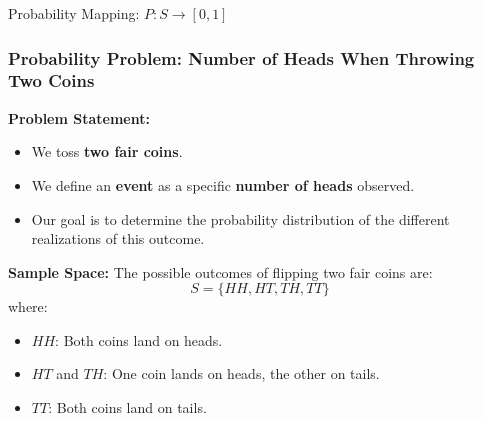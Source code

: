 \documentclass[handout]{beamer} %
\begin{document}
\begin{frame}{Probability Mapping: \(P: S \to [0,1]\)}
    \begin{center}
    \end{center}
\end{frame}


\begin{frame}
    \frametitle{Probability Problem: Number of Heads When Throwing Two Coins}

    \textbf{Problem Statement:}
    \begin{itemize}
        \item We toss \textbf{two fair coins}.
        \item We define an \textbf{event} as a specific \textbf{number of heads} observed.
        \item Our goal is to determine the probability distribution of the different realizations of this outcome.
    \end{itemize}

    \textbf{Sample Space:} The possible outcomes of flipping two fair coins are:
    \[
    S = \{ HH, HT, TH, TT \}
    \]
    where:
    \begin{itemize}
        \item \(HH\): Both coins land on heads.
        \item \(HT\) and \(TH\): One coin lands on heads, the other on tails.
        \item \(TT\): Both coins land on tails.
    \end{itemize}

\end{frame}
\end{document}
